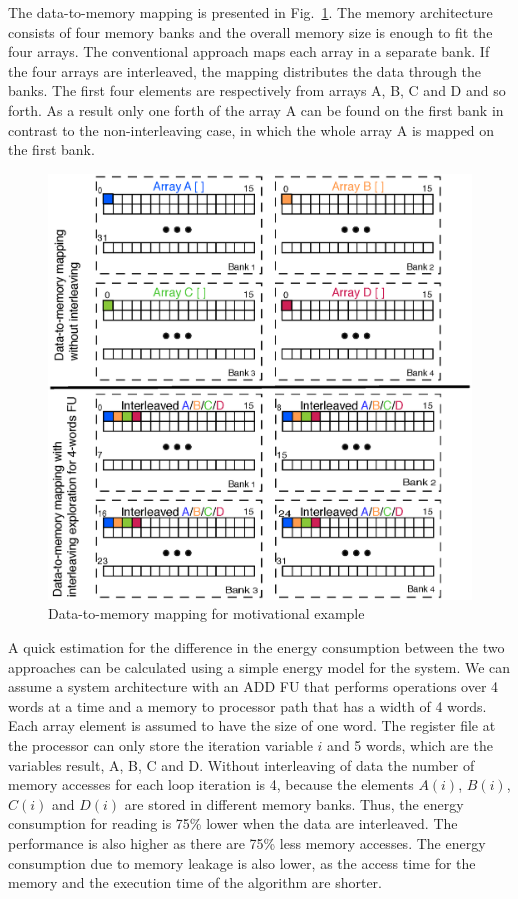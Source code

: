 \documentclass[prodmode,acmtodaes]{acmsmall}
\begin{document}
The data-to-memory mapping is presented in Fig.~\ref{fig:motivation}. 
The memory architecture consists of four memory banks and the overall memory size is enough to fit the four arrays.
The conventional approach maps each array in a separate bank.
If the four arrays are interleaved, the mapping distributes the data through the banks.
The first four elements are respectively from arrays A, B, C and D and so forth.
As a result only one forth of the array A can be found on the first bank in contrast to the non-interleaving case, in which the whole array A is mapped on the first bank.

\begin{figure}
\centering
	\caption{Data-to-memory mapping for motivational example}	
	\label{fig:motivation}
	\includegraphics[scale = 0.5]{Images/motivation.eps}
\end{figure}

A quick estimation for the difference in the energy consumption between the two approaches can be calculated using a simple energy model for the system.
We can assume a system architecture with an ADD FU that performs operations over 4 words at a time and a memory to processor path that has a width of 4 words. 
Each array element is assumed to have the size of one word.
The register file at the processor can only store the iteration variable $i$ and 5 words, which are the variables result, A, B, C and D.
Without interleaving of data the number of memory accesses for each loop iteration is 4, because the elements $A(i)$, $B(i)$, $C(i)$ and $D(i)$ are stored in different memory banks.
Thus, the energy consumption for reading is 75\% lower when the data are interleaved.
The performance is also higher as there are 75\% less memory accesses.
The energy consumption due to memory leakage is also lower, as the access time for the memory and the execution time of the algorithm are shorter.
\end{document}

